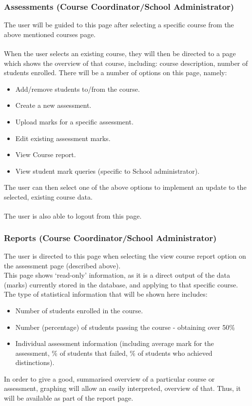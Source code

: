 \documentclass[paper=a4, fontsize=11pt]{scrartcl}
\numberwithin{equation}{section}		%
\numberwithin{figure}{section}			%
\numberwithin{table}{section}				%
\begin{document}
\subsubsection{Assessments (Course Coordinator/School Administrator)}
The user will be guided to this page after selecting a specific course from the above mentioned courses page.\\\\When the user selects an existing course, they will then be directed to a page which shows the overview of that course, including: course description, number of students enrolled. There will be a number of options on this page, namely:
\begin{itemize}
\item Add/remove students to/from the course.
\item Create a new assessment. 
\item Upload marks for a specific assessment.
\item Edit existing assessment marks.
\item View Course report.
\item View student mark queries (specific to School administrator).
\end{itemize}
The user can then select one of the above options to implement an update to the selected, existing course data.\\\\The user is also able to logout from this page.
\subsubsection{Reports (Course Coordinator/School Administrator)}
The user is directed to this page when selecting the view course report option on the assessment page (described above).\\This page shows ‘read-only’ information, as it is a direct output of the data (marks) currently stored in the database, and applying to that specific course.\\The type of statistical information that will be shown here includes:
\begin{itemize}
\item Number of students enrolled in the course.
\item Number (percentage) of students passing the course - obtaining over 50\%
\item Individual assessment information (including average mark for the assessment, \% of students that failed, \% of students who achieved distinctions).
\end{itemize}
In order to give a good, summarised overview of a particular course or assessment, graphing will allow an easily interpreted, overview of that. Thus, it will be available as part of the report page.
\end{document}
